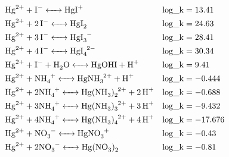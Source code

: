 \documentclass[12pt, a4paper]{article}
\begin{document}
\begin{align}
& \ce{Hg^2+ + I^- <-> HgI^+} && \mathrm{log\_k} = 13.41 \\
& \ce{Hg^2+ + 2I^- <-> HgI2} && \mathrm{log\_k} = 24.63 \\
& \ce{Hg^2+ + 3I^- <-> HgI_3^-} && \mathrm{log\_k} = 28.41 \\
& \ce{Hg^2+ + 4I^- <-> HgI_4^2-} && \mathrm{log\_k} = 30.34 \\
& \ce{Hg^2+ + I^- + H2O <-> HgOHI + H+} && \mathrm{log\_k} = 9.41 \\
& \ce{Hg^2+ + NH4^+ <-> HgNH3^2+ + H+} && \mathrm{log\_k} = -0.444 \\
& \ce{Hg^2+ + 2 NH4^+ <-> Hg(NH3)2^2+ + 2H+} && \mathrm{log\_k} = -0.688 \\
& \ce{Hg^2+ + 3 NH4^+ <-> Hg(NH3)3^2+ + 3H+} && \mathrm{log\_k} = -9.432 \\
& \ce{Hg^2+ + 4 NH4^+ <-> Hg(NH3)4^2+ + 4H+} && \mathrm{log\_k} = -17.676 \\
& \ce{Hg^2+ + NO_3^- <-> HgNO_3^+} && \mathrm{log\_k} = -0.43 \\
& \ce{Hg^2+ + 2 NO_3^- <-> Hg(NO_3)_2} && \mathrm{log\_k} = -0.81 \\

\end{align}
\end{document}
